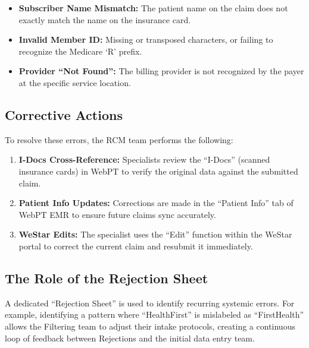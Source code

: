 \documentclass[11pt,a4paper]{article}
\begin{document}
\begin{itemize}
  \item \textbf{Subscriber Name Mismatch:} The patient name on the claim does not exactly match the name on the insurance card.
  \item \textbf{Invalid Member ID:} Missing or transposed characters, or failing to recognize the Medicare `R' prefix.
  \item \textbf{Provider ``Not Found'':} The billing provider is not recognized by the payer at the specific service location.
\end{itemize}

\subsection{Corrective Actions}

To resolve these errors, the RCM team performs the following:

\begin{enumerate}
  \item \textbf{I-Docs Cross-Reference:} Specialists review the ``I-Docs'' (scanned insurance cards) in WebPT to verify the original data against the submitted claim.
  \item \textbf{Patient Info Updates:} Corrections are made in the ``Patient Info'' tab of WebPT EMR to ensure future claims sync accurately.
  \item \textbf{WeStar Edits:} The specialist uses the ``Edit'' function within the WeStar portal to correct the current claim and resubmit it immediately.
\end{enumerate}

\subsection{The Role of the Rejection Sheet}

A dedicated ``Rejection Sheet'' is used to identify recurring systemic errors. For example, identifying a pattern where ``HealthFirst'' is mislabeled as ``FirstHealth'' allows the Filtering team to adjust their intake protocols, creating a continuous loop of feedback between Rejections and the initial data entry team.
\end{document}
